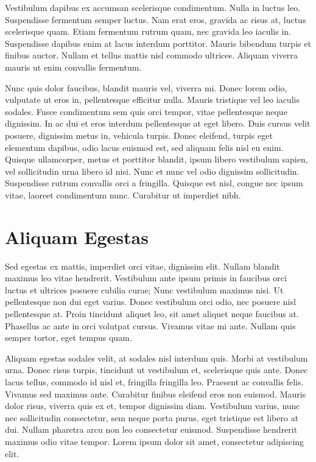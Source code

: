 Vestibulum dapibus ex accumsan scelerisque condimentum. Nulla in luctus leo. Suspendisse fermentum semper luctus. Nam erat eros, gravida ac risus at, luctus scelerisque quam. Etiam fermentum rutrum quam, nec gravida leo iaculis in. Suspendisse dapibus enim at lacus interdum porttitor. Mauris bibendum turpis et finibus auctor. Nullam et tellus mattis nisl commodo ultrices. Aliquam viverra mauris ut enim convallis fermentum.

Nunc quis dolor faucibus, blandit mauris vel, viverra mi. Donec lorem odio, vulputate ut eros in, pellentesque efficitur nulla. Mauris tristique vel leo iaculis sodales. Fusce condimentum sem quis orci tempor, vitae pellentesque neque dignissim. In ac dui et eros interdum pellentesque at eget libero. Duis cursus velit posuere, dignissim metus in, vehicula turpis. Donec eleifend, turpis eget elementum dapibus, odio lacus euismod est, sed aliquam felis nisl eu enim. Quisque ullamcorper, metus et porttitor blandit, ipsum libero vestibulum sapien, vel sollicitudin urna libero id nisi. Nunc et nunc vel odio dignissim sollicitudin. Suspendisse rutrum convallis orci a fringilla. Quisque est nisl, congue nec ipsum vitae, laoreet condimentum nunc. Curabitur ut imperdiet nibh.


\chapter*{Aliquam Egestas}

Sed egestas ex mattis, imperdiet orci vitae, dignissim elit. Nullam blandit maximus leo vitae hendrerit. Vestibulum ante ipsum primis in faucibus orci luctus et ultrices posuere cubilia curae; Nunc vestibulum maximus nisi. Ut pellentesque non dui eget varius. Donec vestibulum orci odio, nec posuere nisl pellentesque at. Proin tincidunt aliquet leo, sit amet aliquet neque faucibus at. Phasellus ac ante in orci volutpat cursus. Vivamus vitae mi ante. Nullam quis semper tortor, eget tempus quam.

Aliquam egestas sodales velit, at sodales nisl interdum quis. Morbi at vestibulum urna. Donec risus turpis, tincidunt ut vestibulum et, scelerisque quis ante. Donec lacus tellus, commodo id nisl et, fringilla fringilla leo. Praesent ac convallis felis. Vivamus sed maximus ante. Curabitur finibus eleifend eros non euismod. Mauris dolor risus, viverra quis ex et, tempor dignissim diam. Vestibulum varius, nunc nec sollicitudin consectetur, sem neque porta purus, eget tristique est libero at dui. Nullam pharetra arcu non leo consectetur euismod. Suspendisse hendrerit maximus odio vitae tempor. Lorem ipsum dolor sit amet, consectetur adipiscing elit.

